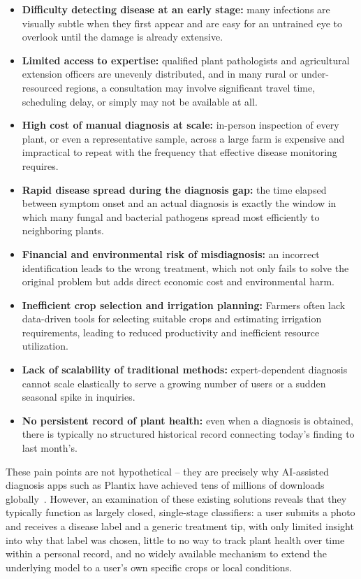 \begin{itemize}[leftmargin=*]
\item \textbf{Difficulty detecting disease at an early stage:} many infections are visually subtle when they first appear and are easy for an untrained eye to overlook until the damage is already extensive.
\item \textbf{Limited access to expertise:} qualified plant pathologists and agricultural extension officers are unevenly distributed, and in many rural or under-resourced regions, a consultation may involve significant travel time, scheduling delay, or simply may not be available at all.
\item \textbf{High cost of manual diagnosis at scale:} in-person inspection of every plant, or even a representative sample, across a large farm is expensive and impractical to repeat with the frequency that effective disease monitoring requires.
\item \textbf{Rapid disease spread during the diagnosis gap:} the time elapsed between symptom onset and an actual diagnosis is exactly the window in which many fungal and bacterial pathogens spread most efficiently to neighboring plants.
\item \textbf{Financial and environmental risk of misdiagnosis:} an incorrect identification leads to the wrong treatment, which not only fails to solve the original problem but adds direct economic cost and environmental harm.
\item \textbf{Inefficient crop selection and irrigation planning:} Farmers often lack data-driven tools for selecting suitable crops and estimating irrigation requirements, leading to reduced productivity and inefficient resource utilization.
\item \textbf{Lack of scalability of traditional methods:} expert-dependent diagnosis cannot scale elastically to serve a growing number of users or a sudden seasonal spike in inquiries.
\item \textbf{No persistent record of plant health:} even when a diagnosis is obtained, there is typically no structured historical record connecting today's finding to last month's.
\end{itemize}

These pain points are not hypothetical -- they are precisely why AI-assisted diagnosis apps such as Plantix have achieved tens of millions of downloads globally~\cite{gsma_plantix}. However, an examination of these existing solutions reveals that they typically function as largely closed, single-stage classifiers: a user submits a photo and receives a disease label and a generic treatment tip, with only limited insight into why that label was chosen, little to no way to track plant health over time within a personal record, and no widely available mechanism to extend the underlying model to a user's own specific crops or local conditions.

